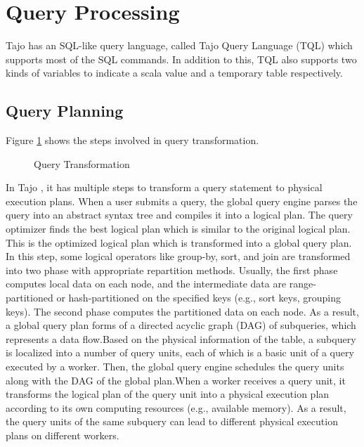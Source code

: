 \documentclass[9pt,twocolumn,twoside]{../../styles/osajnl}
\begin{document}
\section{Query Processing}
Tajo has an SQL-like query language, called
\cite{www-apache-tajo-tsql} Tajo Query Language (TQL) which supports
most of the SQL commands. In addition to this, TQL also supports two
kinds of variables to indicate a scala value and a temporary table
respectively.

\subsection{Query Planning}

Figure \ref{fig:queryplanning} shows the steps involved in query transformation. 

\begin{figure}[htbp]
\centering
{}
\caption{\cite{tajo-paper} Query Transformation}
\label{fig:queryplanning}
\end{figure}

\noindent
In Tajo \cite{tajo-paper} \cite{www-apache-tajo}, it has multiple
steps to transform a query statement to physical execution plans. When
a user submits a query, the global query engine parses the query into
an abstract syntax tree and compiles it into a logical plan. The query
optimizer finds the best logical plan which is similar to the original
logical plan. This is the optimized logical plan which is transformed
into a global query plan. In this step, some logical operators like
group-by, sort, and join are transformed into two phase with
appropriate repartition methods. Usually, the first phase computes
local data on each node, and the intermediate data are
range-partitioned or hash-partitioned on the specified keys (e.g.,
sort keys, grouping keys). The second phase computes the partitioned
data on each node. As a result, a global query plan forms of a
directed acyclic graph (DAG) of subqueries, which represents a data
flow.Based on the physical information of the table, a subquery is
localized into a number of query units, each of which is a basic unit
of a query executed by a worker. Then, the global query engine
schedules the query units along with the DAG of the global
plan.\newline \newline When a worker receives a query unit, it
transforms the logical plan of the query unit into a physical
execution plan according to its own computing resources (e.g.,
available memory). As a result, the query units of the same subquery
can lead to different physical execution plans on different workers.
\end{document}
